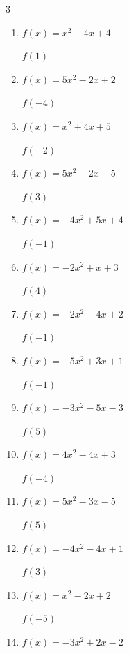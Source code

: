 \begin{multicols}{3}
\begin{enumerate}
$f(-4)$
        \phantom{$= -37$}

  \item $f(x)=x^{2}-4x+4$

$f(1)$
        \phantom{$= 1$}

  \item $f(x)=5x^{2}-2x+2$

$f(-4)$
        \phantom{$= 90$}

  \item $f(x)=x^{2}+4x+5$

$f(-2)$
        \phantom{$= 1$}

  \item $f(x)=5x^{2}-2x-5$

$f(3)$
        \phantom{$= 34$}

  \item $f(x)=-4x^{2}+5x+4$

$f(-1)$
        \phantom{$= -5$}

  \item $f(x)=-2x^{2}+x+3$

$f(4)$
        \phantom{$= -25$}

  \item $f(x)=-2x^{2}-4x+2$

$f(-1)$
        \phantom{$= 4$}

  \item $f(x)=-5x^{2}+3x+1$

$f(-1)$
        \phantom{$= -7$}

  \item $f(x)=-3x^{2}-5x-3$

$f(5)$
        \phantom{$= -103$}

  \item $f(x)=4x^{2}-4x+3$

$f(-4)$
        \phantom{$= 83$}

  \item $f(x)=5x^{2}-3x-5$

$f(5)$
        \phantom{$= 105$}

\columnbreak %

  \item $f(x)=-4x^{2}-4x+1$

$f(3)$
        \phantom{$= -47$}

  \item $f(x)=x^{2}-2x+2$

$f(-5)$
        \phantom{$= 37$}

  \item $f(x)=-3x^{2}+2x-2$


\end{enumerate}
\end{multicols}
